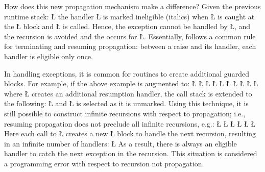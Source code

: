\documentclass[openright,twoside]{report}
\begin{document}
How does this new propagation mechanism make a difference?
Given the previous runtime stack:
\LGinlinefalse\LGbegin\lgrinde
\L{}
\endlgrinde\LGend
the handler \LGinlinetrue\LGbegin\lgrinde\L{}\endlgrinde\LGend{} is marked ineligible (italics) when \LGinlinetrue\LGbegin\lgrinde\L{}\endlgrinde\LGend{} is caught at the \LGinlinetrue\LGbegin\lgrinde\L{}\endlgrinde\LGend{} block and \LGinlinetrue\LGbegin\lgrinde\L{}\endlgrinde\LGend{} is called.
Hence, the exception cannot be handled by \LGinlinetrue\LGbegin\lgrinde\L{}\endlgrinde\LGend{}, and the recursion is avoided and the  occurs for \LGinlinetrue\LGbegin\lgrinde\L{}\endlgrinde\LGend{}.
Essentially, \uC follows a common rule for terminating and resuming propagation: between a raise and its handler, each handler is eligible only once.

In handling exceptions, it is common for routines to create additional guarded blocks.
For example, if the above example is augmented to:
\LGinlinefalse\LGbegin\lgrinde
\L{}
\L{\LB{}}
\L{\LB{}}
\L{\LB{}}
\CE{}\L{\LB{\}}}
\L{}
\L{\LB{}}
\L{\LB{}}
\L{\LB{}}
\CE{}\L{\LB{\}}}
\endlgrinde\LGend
where \LGinlinetrue\LGbegin\lgrinde\L{}\endlgrinde\LGend{} creates an additional resumption handler, the call stack is extended to the following:
\LGinlinefalse\LGbegin\lgrinde
\L{}
\endlgrinde\LGend
and \LGinlinetrue\LGbegin\lgrinde\L{}\endlgrinde\LGend{} is selected as it is unmarked.
Using this technique, it is still possible to construct infinite recursions with respect to propagation;
i.e., \uC resuming propagation does not preclude all infinite recursions, e.g.:
\LGinlinefalse\LGbegin\lgrinde
\L{}
\L{}
\L{\LB{}}
\L{\LB{}}
\L{\LB{}}
\CE{}\L{\LB{\}}}
\endlgrinde\LGend
Here each call to \LGinlinetrue\LGbegin\lgrinde\L{}\endlgrinde\LGend{} creates a new \LGinlinetrue\LGbegin\lgrinde\L{}\endlgrinde\LGend{} block to handle the next recursion, resulting in an infinite number of handlers:
\LGinlinefalse\LGbegin\lgrinde
\L{}
\endlgrinde\LGend
As a result, there is always an eligible handler to catch the next exception in the recursion.
This situation is considered a programming error with respect to recursion not propagation.
\end{document}
